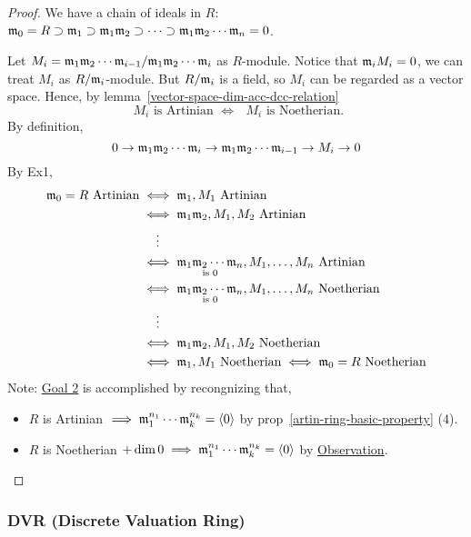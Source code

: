 \begin{proof}
  We have a chain of ideals in $R$:
  $\mathfrak{m}_0 = R \supset \mathfrak{m}_1 \supset \mathfrak{m}_1\mathfrak{m}_2 \supset \dots \supset
  \mathfrak{m}_1\mathfrak{m}_2\dotsm\mathfrak{m}_n = 0$.

  Let $M_i = {\mathfrak{m}_1\mathfrak{m}_2\dotsm\mathfrak{m}_{i-1}}/{\mathfrak{m}_1\mathfrak{m}_2\dotsm\mathfrak{m}_i}$
  as $R$-module.
  Notice that $\mathfrak{m}_i M_i = 0$, we can treat $M_i$ as ${R}/{\mathfrak{m}_i}$-module.
  But ${R}/{\mathfrak{m}_i}$ is a field, so $M_i$ can be regarded as a vector
  space. Hence, by lemma~\ref{vector-space-dim-acc-dcc-relation}
  \[ 
  \text{ $M_i$ is Artinian $\iff$ $M_i$ is Noetherian. } 
  \]
  By definition, 
  $$
  0 \to \mathfrak{m}_1\mathfrak{m}_2\dotsm\mathfrak{m}_i \to \mathfrak{m}_1\mathfrak{m}_2\dotsm\mathfrak{m}_{i-1}
  \to M_i \to 0
  $$
  By Ex1,
  $$
    \begin{aligned}
      \mathfrak{m}_0 = R \text{ Artinian} & \iff \mathfrak{m}_1 , M_1 \text{ Artinian} \\
      & \iff \mathfrak{m}_1 \mathfrak{m}_2 , M_1, M_2 \text{ Artinian} \\
      & \hspace{13pt} \vdots \\
      & \iff \underset{\text{is } 0}{\mathfrak{m}_1 \mathfrak{m}_2 \cdots \mathfrak{m}_n}, M_1, 
      \dots, M_n \text{ Artinian} \\
      & \iff \underset{\text{is } 0}{\mathfrak{m}_1 \mathfrak{m}_2 \cdots \mathfrak{m}_n}, M_1, 
      \dots, M_n \text{ Noetherian} \\
      & \hspace{13pt} \vdots \\
      & \iff \mathfrak{m}_1 \mathfrak{m}_2 , M_1, M_2 \text{ Noetherian} \\
      & \iff \mathfrak{m}_1 , M_1 \text{ Noetherian} \iff \mathfrak{m}_0 = R \text{ Noetherian}
    \end{aligned}
  $$
  Note: \underline{Goal 2} is accomplished by recongnizing that,
  \begin{itemize}
    \item $R$ is Artinian $\implies \mathfrak{m}_1^{n_1}\cdots \mathfrak{m}_k^{n_k} = \langle0\rangle$
      by prop~\ref{artin-ring-basic-property} (4).
  \item $R$ is Noetherian $+ \dim 0 \implies \mathfrak{m}_1^{n_1} \cdots \mathfrak{m}_k^{n_k} = \langle0\rangle$ by \underline{Observation}.
  \end{itemize}
\end{proof}


\subsubsection{DVR (Discrete Valuation Ring)}

